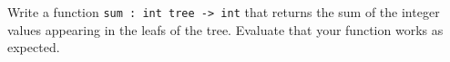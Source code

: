 Write a function \lstinline{sum : int tree -> int} that returns the
sum of the integer values appearing in the leafs of the tree. Evaluate
that your function works as expected.

